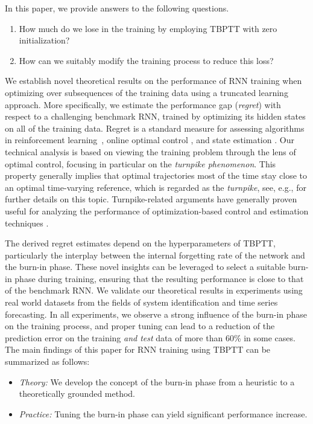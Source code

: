\documentclass{article} %
\begin{document}
In this paper, we provide answers to the following questions.
\begingroup
\it
\begin{enumerate}
	\item How much do we lose in the training by employing TBPTT with zero initialization?
	\item How can we suitably modify the training process to reduce this loss?
\end{enumerate}
\endgroup
We establish novel theoretical results on the performance of RNN training when optimizing over subsequences of the training data using a truncated learning approach.
More specifically, we estimate the performance gap (\emph{regret}) with respect to a challenging benchmark RNN, trained by optimizing its hidden states on all of the training data.
{Regret is a standard measure for assessing algorithms in reinforcement learning~\citep{Jaksch2010,Agrawal2021}, online optimal control \citep{Agarwal2019,Li2019,Nonhoff2022,Martin2024a}, and state estimation \citep{Brouillon2023,Schiller2025}.}
{Our technical analysis is based on viewing the training problem through the lens of optimal control, focusing in particular on the \emph{turnpike phenomenon}.
This property generally implies that optimal trajectories most of the time stay close to an optimal time-varying reference, which is regarded as the \emph{turnpike}, see, e.g., \citet{Trelat2025,Faulwasser2022,Zaslavski2006,Carlson1991} for further details on this topic.
Turnpike-related arguments have generally proven useful for analyzing the performance of optimization-based control and estimation techniques \citep{Faulwasser2018,Gruene2019,Schiller2025}.}

The derived regret estimates depend on the hyperparameters of TBPTT, particularly the interplay between the internal forgetting rate of the network and the burn-in phase.
These novel insights can be leveraged to select a suitable burn-in phase during training, ensuring that the resulting performance is close to that of the benchmark RNN.
We validate our theoretical results in experiments using real world datasets from the fields of system identification and time series forecasting. In all experiments, we observe a strong influence of the burn-in phase on the training process, and proper tuning can lead to a reduction of the prediction error on the training \emph{and test} data of more than 60\% in some cases.
The main findings of this paper for RNN training using TBPTT can be summarized as follows:
\begin{itemize}
	\item \emph{Theory:} We develop the concept of the burn-in phase from a heuristic to a theoretically grounded method.
	\item \emph{Practice:} Tuning the burn-in phase can yield significant performance increase.
\end{itemize}
\end{document}
